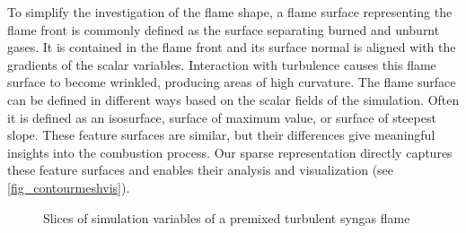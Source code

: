 To simplify the investigation of the flame shape, a flame surface representing
the flame front is commonly defined as the surface separating burned and unburnt
gases. It is contained in the flame front and its surface normal is aligned with
the gradients of the scalar variables.
%
%
Interaction with turbulence causes this flame surface to become wrinkled,
producing areas of high curvature. The flame surface can be defined in different
ways based on the scalar fields of the simulation. Often it is defined as an
isosurface, surface of maximum value, or surface of steepest slope. These
feature surfaces are similar, but their differences give meaningful insights
into the combustion process. Our sparse representation directly captures these
feature surfaces and enables their analysis and visualization (see
\cref{fig_contourmeshvis}).

\begin{figure}[t]
    \setlength\figurewidth\textwidth
    \centering
    
    \vspace*{-5mm}
    \caption{Slices of simulation variables of a premixed turbulent syngas flame}
    \label{fig:sim_vars}
\end{figure}


